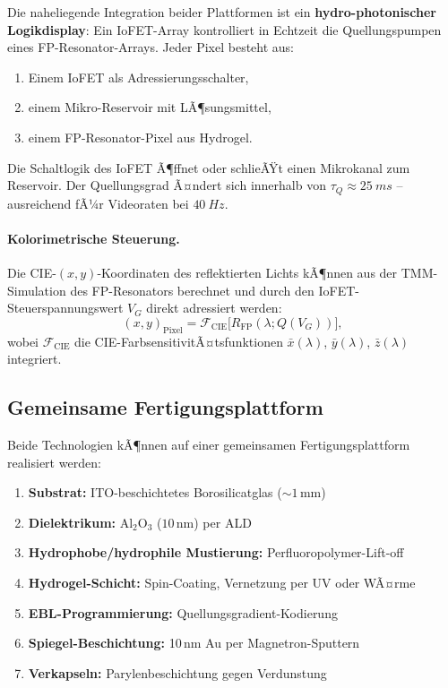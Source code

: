 ﻿\documentclass[a4paper,12pt]{scrreprt}
\theoremstyle{definition}
\begin{document}
Die naheliegende Integration beider Plattformen ist ein \textbf{hydro-photonischer
Logikdisplay}: Ein IoFET-Array kontrolliert in Echtzeit die Quellungspumpen
eines FP-Resonator-Arrays. Jeder Pixel besteht aus:
\begin{enumerate}
  \item Einem IoFET als Adressierungsschalter,
  \item einem Mikro-Reservoir mit LÃ¶sungsmittel,
  \item einem FP-Resonator-Pixel aus Hydrogel.
\end{enumerate}

Die Schaltlogik des IoFET Ã¶ffnet oder schlieÃŸt einen Mikrokanal zum Reservoir.
Der Quellungsgrad Ã¤ndert sich innerhalb von $\tau_Q \approx \SI{25}{ms}$ --
ausreichend fÃ¼r Videoraten bei $\SI{40}{Hz}$.

\paragraph{Kolorimetrische Steuerung.}
Die CIE-$(x,y)$-Koordinaten des reflektierten Lichts kÃ¶nnen aus der
TMM-Simulation des FP-Resonators berechnet und durch den IoFET-Steuerspannungswert
$V_G$ direkt adressiert werden:
\begin{equation}
  (x, y)_\mathrm{Pixel} = \mathcal{F}_{\mathrm{CIE}}\bigl[R_\mathrm{FP}(\lambda; Q(V_G))\bigr],
\end{equation}
wobei $\mathcal{F}_{\mathrm{CIE}}$ die CIE-FarbsensitivitÃ¤tsfunktionen $\bar{x}(\lambda)$,
$\bar{y}(\lambda)$, $\bar{z}(\lambda)$ integriert.

\subsection{Gemeinsame Fertigungsplattform}

Beide Technologien kÃ¶nnen auf einer gemeinsamen Fertigungsplattform realisiert werden:

\begin{enumerate}
  \item \textbf{Substrat:} ITO-beschichtetes Borosilicatglas ($\sim 1$\,mm)
  \item \textbf{Dielektrikum:} Al$_2$O$_3$ ($10$\,nm) per ALD
  \item \textbf{Hydrophobe/hydrophile Mustierung:} Perfluoropolymer-Lift-off
  \item \textbf{Hydrogel-Schicht:} Spin-Coating, Vernetzung per UV oder WÃ¤rme
  \item \textbf{EBL-Programmierung:} Quellungsgradient-Kodierung
  \item \textbf{Spiegel-Beschichtung:} 10\,nm Au per Magnetron-Sputtern
  \item \textbf{Verkapseln:} Parylenbeschichtung gegen Verdunstung
\end{enumerate}
\end{document}
